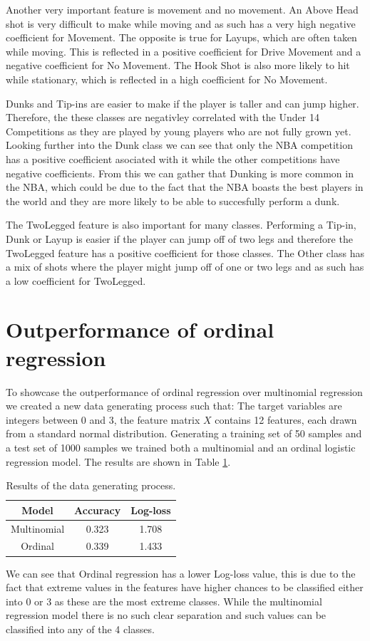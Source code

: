 \documentclass[9pt]{IEEEtran}
\begin{document}
Another very important feature is movement and no movement.
An Above Head shot is very difficult to make while moving and as such has a very high negative coefficient for Movement.
The opposite is true for Layups, which are often taken while moving.
This is reflected in a positive coefficient for Drive Movement and a negative coefficient for No Movement.
The Hook Shot is also more likely to hit while stationary, which is reflected in a high coefficient for No Movement.

Dunks and Tip-ins are easier to make if the player is taller and can jump higher.
Therefore, the these classes are negativley correlated with the Under 14 Competitions as they are played by young players who are not fully grown yet.
Looking further into the Dunk class we can see that only the NBA competition has a positive coefficient asociated with it while the other competitions have negative coefficients.
From this we can gather that Dunking is more common in the NBA, which could be due to the fact that the NBA boasts the best players in the world and they are more likely to be able to succesfully perform a dunk.

The TwoLegged feature is also important for many classes.
Performing a Tip-in, Dunk or Layup is easier if the player can jump off of two legs and therefore the TwoLegged feature has a positive coefficient for those classes.
The Other class has a mix of shots where the player might jump off of one or two legs and as such has a low coefficient for TwoLegged.


\section{Outperformance of ordinal regression}
To showcase the outperformance of ordinal regression over multinomial regression we created a new data generating process such that:
The target variables are integers between 0 and 3, the feature matrix $X$ contains 12 features, each drawn from a standard normal distribution.
Generating a training set of 50 samples and a test set of 1000 samples we trained both a multinomial and an ordinal logistic regression model.
The results are shown in Table \ref{tab:results}.
\begin{table}[H]
    \centering
    \begin{tabular}{|c|c|c|}
        \hline
        Model & Accuracy & Log-loss\\
        \hline
        Multinomial & 0.323 & 1.708\\
        Ordinal & 0.339 & 1.433\\
        \hline
    \end{tabular}
    \caption{Results of the data generating process.}
    \label{tab:results}
\end{table}
We can see that Ordinal regression has a lower Log-loss value, this is due to the fact that extreme values in the features have higher chances to be classified either into 0 or 3 as these are the most extreme classes.
While the multinomial regression model there is no such clear separation and such values can be classified into any of the 4 classes.
\end{document}
